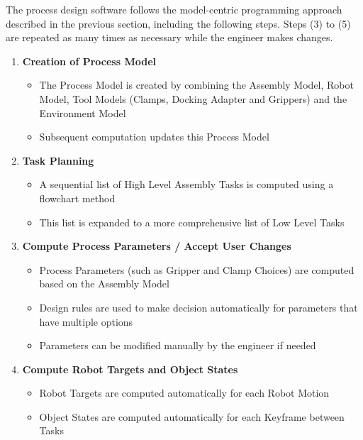The process design software follows the model-centric programming approach described in the previous section, including the following steps. Steps (3) to (5) are repeated as many times as necessary while the engineer makes changes.
\begin{enumerate}
	\item \textbf{Creation of Process Model}
	\begin{itemize}
		\item The Process Model is created by combining the Assembly Model, Robot Model, Tool Models (Clamps, Docking Adapter and Grippers) and the Environment Model
		\item Subsequent computation updates this Process Model
	\end{itemize}

	\item \textbf{Task Planning}
	\begin{itemize}
		\item A sequential list of High Level Assembly Tasks is computed using a flowchart method 
		\item This list is expanded to a more comprehensive list of Low Level Tasks 
	\end{itemize}

	\item \textbf{Compute Process Parameters / Accept User Changes}
	\begin{itemize}
		\item Process Parameters (such as Gripper and Clamp Choices) are computed based on the Assembly Model 
		\item Design rules are used to make decision automatically for parameters that have multiple options
		\item Parameters can be modified manually by the engineer if needed
	\end{itemize}

	\item \textbf{Compute Robot Targets and Object States}
	\begin{itemize}
		\item Robot Targets are computed automatically for each Robot Motion\\
		\item Object States are computed automatically for each Keyframe between Tasks 
	\end{itemize}


\end{enumerate}
